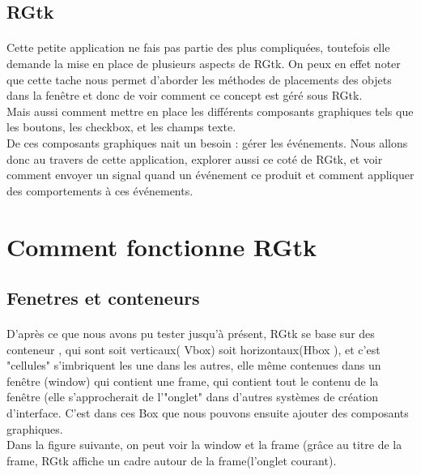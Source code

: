 \documentclass{article}
\begin{document}
\subsection{RGtk}
\paragraph{} 
Cette petite application ne fais pas partie des plus compliquées, toutefois elle demande la mise en place de plusieurs aspects de RGtk. On peux en effet noter que cette tache nous permet d'aborder les méthodes de placements des objets dans la fenêtre et donc de voir comment ce concept est géré sous RGtk.\\
Mais aussi comment mettre en place les différents composants graphiques tels que les boutons, les checkbox, et les champs texte.\\
De ces composants graphiques nait un besoin : gérer les événements. Nous allons donc au travers de cette application, explorer aussi ce coté de RGtk, et voir comment envoyer un signal quand un événement ce produit et comment appliquer des comportements à ces événements.\\

\newpage

\section{Comment fonctionne RGtk}
\subsection{Fenetres et conteneurs}
\paragraph{} 
D'après ce que nous avons pu tester jusqu'à présent, RGtk se base sur des conteneur , qui sont soit verticaux( Vbox) soit horizontaux(Hbox ), et c'est "cellules" s'imbriquent les une dans les autres, elle même contenues dans un fenêtre (window) qui contient une frame, qui contient tout le contenu de la fenêtre (elle s’approcherait de l'"onglet" dans d'autres systèmes de création d'interface. C'est dans ces Box que nous pouvons ensuite ajouter des composants graphiques.\\

Dans la figure suivante, on peut voir la window et la frame (grâce au titre de la frame, RGtk affiche un cadre autour de la frame(l'onglet courant).\\
\end{document}
